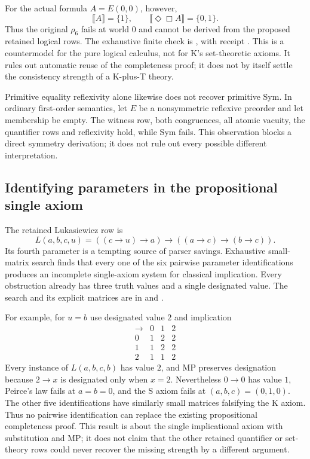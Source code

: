 For the actual formula $A=E(0,0)$, however,
\[
 \llbracket A\rrbracket=\{1\},\qquad
 \llbracket\Diamond\Box A\rrbracket=\{0,1\}.
\]
Thus the original $\rho_6$ fails at world $0$ and cannot be derived from
the proposed retained logical rows.  The exhaustive finite check is
, with receipt
.  This is a countermodel
for the pure logical calculus, not for K's set-theoretic axioms.  It rules
out automatic reuse of the completeness proof; it does not by itself
settle the consistency strength of a K-plus-T theory.

Primitive equality reflexivity alone likewise does not recover primitive
Sym.  In ordinary first-order semantics, let $E$ be a nonsymmetric
reflexive preorder and let membership be empty.  The witness row, both
congruences, all atomic vacuity, the quantifier rows and reflexivity hold,
while Sym fails.  This observation blocks a direct symmetry derivation;
it does not rule out every possible different interpretation.

\subsection{Identifying parameters in the propositional single axiom}

The retained Lukasiewicz row is
\[
 L(a,b,c,u)=((c\to u)\to a)\to((a\to c)\to(b\to c)).
\]
Its fourth parameter is a tempting source of parser savings.  Exhaustive
small-matrix search finds that every one of the six pairwise parameter
identifications produces an incomplete single-axiom system for classical
implication.  Every obstruction already has three truth values and a
single designated value.  The search and its explicit matrices are in
 and
.

For example, for $u=b$ use designated value $2$ and implication
\[
\begin{array}{c|ccc}
 \to&0&1&2\\\hline
 0&1&2&2\\
 1&1&2&2\\
 2&1&1&2
\end{array}
\]
Every instance of $L(a,b,c,b)$ has value $2$, and MP preserves designation
because $2\to x$ is designated only when $x=2$.  Nevertheless $0\to0$
has value $1$, Peirce's law fails at $a=b=0$, and the S axiom fails at
$(a,b,c)=(0,1,0)$.  The other five identifications have similarly small
matrices falsifying the K axiom.  Thus no pairwise identification can
replace the existing propositional completeness proof.  This result is
about the single implicational axiom with substitution and MP; it does
not claim that the other retained quantifier or set-theory rows could
never recover the missing strength by a different argument.

